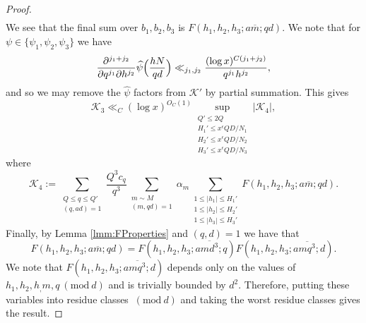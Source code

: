 \documentclass[10pt]{amsart}
\theoremstyle{plain}
\numberwithin{equation}{section}
\newcommand{\Mod}[1]{\ (\mathrm{mod}\ #1)}
\renewcommand{\hat}[1]{\widehat #1}
\begin{document}
\begin{proof}
\begin{align*}
\end{align*}
We see that the final sum over $b_1,b_2,b_3$ is $F(h_1,h_2,h_3;a\overline{m};q d)$. We note that for $\psi\in\{\psi_1,\psi_2,\psi_3\}$ we have
\[
\frac{\partial^{j_1+j_2}}{\partial q^{j_1}\partial h^{j_2}}\hat{\psi}\Bigl(\frac{h N}{q d}\Bigr)\ll_{j_1,j_2}\frac{(\log{x})^{C(j_1+j_2)}}{q^{j_1}h^{j_2}},
\]
and so we may remove the $\hat{\psi}$ factors from $\mathscr{K}'$ by partial summation. This gives
\[
\mathscr{K}_3\ll_C (\log{x})^{O_C(1)}\sup_{\substack{Q'\le 2Q\\H_1'\le x^\epsilon Q D/N_1\\ H_2'\le x^\epsilon Q D/N_2\\ H_3'\le x^\epsilon Q D/N_3}}|\mathscr{K}_4|,
\]
where
\[
\mathscr{K}_4:=\sum_{\substack{Q\le q \le Q'\\ (q,a d)=1}}\frac{Q^3 c_q}{q^3}\sum_{\substack{m\sim M\\ (m,q d)=1}}\alpha_m\sum_{\substack{1\le |h_1|\le H_1' \\ 1\le |h_2|\le H_2'\\ 1\le |h_3|\le H_3'}}F(h_1,h_2,h_3;a\overline{m};q d).
\]
Finally, by Lemma \ref{lmm:FProperties} and $(q,d)=1$ we have that 
\[
F(h_1,h_2,h_3;a\overline{m};q d)=F(h_1,h_2,h_3;a\overline{m d^3};q)F(h_1,h_2,h_3;a\overline{m q^3};d).
\]
We note that $F(h_1,h_2,h_3;a\overline{m q^3};d)$ depends only on the values of $h_1,h_2,h_,m,q\Mod{d}$ and is trivially bounded by $d^2$. Therefore, putting these variables into residue classes $\Mod{d}$ and taking the worst residue classes gives the result.
\end{proof}
%
%
%
%
%
%
%
%
\end{document}

